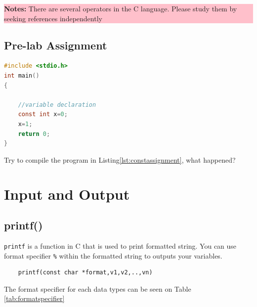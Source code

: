 \begin{center}
	\colorbox{pink}{\parbox{0.8\linewidth}{\textbf{Notes:} There are several operators in the C language. Please study them by seeking references independently}}
\end{center}
\subsection{Pre-lab Assignment}
\begin{lstlisting}[language=c,caption=Using assignment operator in a const variable,label=lst:constassignment,captionpos=t]
#include <stdio.h>
int main()
{

	//variable declaration
    const int x=0;
    x=1;
	return 0;
}
\end{lstlisting}
Try to compile the program in Listing\ref{lst:constassignment}, what happened?


\section{Input and Output}

\subsection{printf()}
\verb*|printf| is a function in C that is used to print formatted string.  You can use format specifier \verb*|%| within the formatted string to outputs your variables.

\begin{verbatim}
	printf(const char *format,v1,v2,..,vn)
\end{verbatim}

The format specifier for each data types can be seen on Table \ref{tab:formatspecifier}


